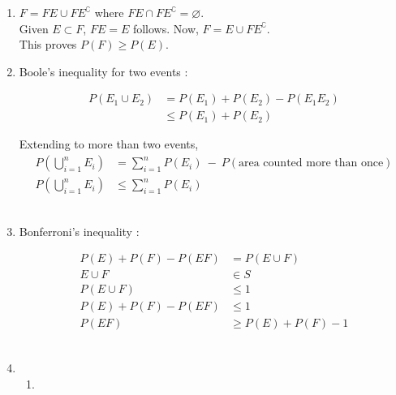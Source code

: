 \begin{enumerate}
	\item $ F = FE \cup F E^\complement $ where $ FE \cap F E^\complement = \varnothing $. \\
	Given $ E \subset F $, $ FE = E $ follows. Now, $ F = E \cup F E^\complement $. \\
	This proves $ P(F) \geq P(E) $. \\
	
	\item Boole's inequality for two events : 
	
		\begin{align}
			P(E_1 \cup E_2) &= P(E_1) + P(E_2) - P(E_1 E_2)\\
			& \leq P(E_1) + P(E_2)
		\end{align}
		
		Extending to more than two events, \\
		
		\begin{align}
			P \left( \bigcup_{i = 1}^{n} E_i \right) &= \sum\limits_{i = 1}^{n} P(E_i) \ - \ P(\text{area counted more than once}) \\
			P \left( \bigcup_{i = 1}^{n} E_i \right) &\leq \sum\limits_{i = 1}^{n} P(E_i)
		\end{align}
	\\
	
	\item Bonferroni's inequality : 
	
		\begin{align}
			P(E) + P(F) - P(EF)  &= P(E \cup F) \\
			E \cup F &\in S\\
			P(E \cup F) &\leq 1 \\
			P(E) + P(F) - P(EF) &\leq 1 \\
			P(EF) &\geq P(E) + P(F) - 1
		\end{align}
	 \\
	
	\item	\begin{enumerate}
		\item 
		

\end{enumerate}
\end{enumerate}
